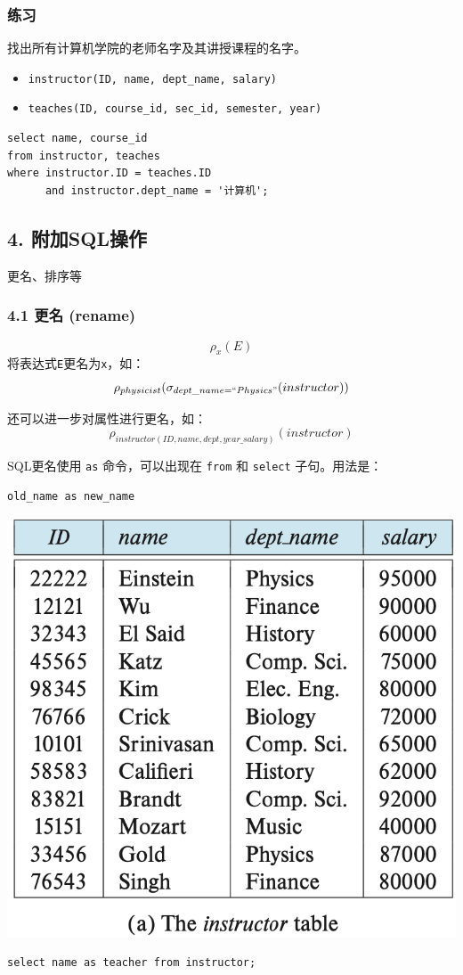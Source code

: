 \documentclass[aspectratio=169, 14pt]{beamer}
\begin{document}
\begin{frame}[fragile]
    \frametitle{练习}
    {\large {}} 找出所有计算机学院的老师名字及其讲授课程的名字。

\begin{itemize}
    \item \texttt{instructor(ID, name, dept\_name, salary)}
    \item \texttt{teaches(ID, course\_id, sec\_id, semester, year)}
\end{itemize}
    \pause
    \begin{verbatim} 
select name, course_id
from instructor, teaches
where instructor.ID = teaches.ID 
      and instructor.dept_name = '计算机';
    \end{verbatim}    
\end{frame}
\begin{frame}
    \section{\textcolor{darkmidnightblue}{4. 附加SQL操作}} 
更名、排序等
\end{frame}
\begin{frame}
    \frametitle{4.1 更名 (rename)}
{\large \[\rho_x(E)\]}
将表达式\texttt{E}更名为\texttt{x}，如：\[\rho_{physicist}(\sigma_{dept\_name=``Physics"}(instructor))\]

还可以进一步对属性进行更名，如：\[\rho_{instructor(ID, name, dept, year\_salary)}(instructor)\]

\end{frame}

\begin{frame}[fragile]
    SQL更名使用 \texttt{as} 命令，可以出现在 \texttt{from} 和 \texttt{select} 子句。用法是：
\begin{verbatim}
old_name as new_name    
\end{verbatim}

\includegraphics[width=.6\textwidth,trim={0cm 8.5cm 0cm 0cm},clip]{table/instructor}

\begin{verbatim} 
select name as teacher from instructor;
\end{verbatim} 

\end{frame}
\end{document}
